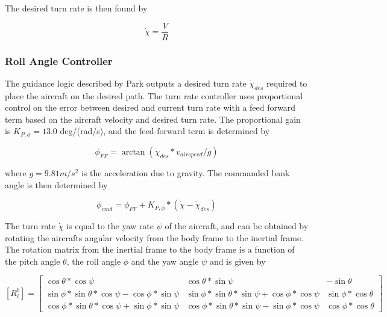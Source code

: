 \documentclass{aiaa}
\begin{document}
    The desired turn rate is then found by
    
    \begin{equation}
    \dot{\chi} = \frac{V}{R}
    \end{equation}
\subsubsection{Roll Angle Controller}

The guidance logic described by Park outputs a desired turn rate $\dot{\chi}_{des}$ required to place the aircraft on the desired path. The turn rate controller uses proportional control on the error between desired and current turn rate with a feed forward term based on the aircraft velocity and desired turn rate. The proportional gain is $K_{P,\phi} = 13.0$  deg/(rad/s), and the feed-forward term is determined by


\begin{equation}
	\phi_{FF} = \arctan{(\dot{\chi}_{des}*v_{airspeed}/g)}
\end{equation}

where $g=9.81 m/s^2$ is the acceleration due to gravity. The commanded bank angle is then determined by

\begin{equation}
\label{eqn:rollcmd}
	\phi_{cmd} = \phi_{FF} + K_{P,\phi}*(\dot{\chi} - \dot{\chi}_{des})
\end{equation}

The turn rate $\dot{\chi}$ is equal to the yaw rate $\dot{\psi}$ of the aircraft, and can be obtained by rotating the aircrafts angular velocity from the body frame to the inertial frame. The rotation matrix from the inertial frame to the body frame is a function of the pitch angle $\theta$, the roll angle $\phi$ and the yaw angle $\psi$ and is given by


\begin{equation}
\label{eqn:rot_mat}
[R_i^b] = 
	\begin{bmatrix}
		\cos{\theta}*\cos{\psi} & \cos{\theta}*\sin{\psi} & 					-\sin{\theta}\\
		\sin{\phi}* \sin{\theta}*\cos{\psi} - \cos{\phi}*\sin{\psi} & 			\sin{\phi}* \sin{\theta}*\sin{\psi} + \cos{\phi}*\cos{\psi} & 			\sin{\phi}*\cos{\theta} \\
		\cos{\phi}* \sin{\theta}*\cos{\psi} + \sin{\phi}*\sin{\psi} & 			\cos{\phi}* \sin{\theta}*\sin{\psi} - \sin{\phi}*\cos{\psi} & 			\cos{\phi}*\cos{\theta} 
	\end{bmatrix}
\end{equation}
\end{document}
